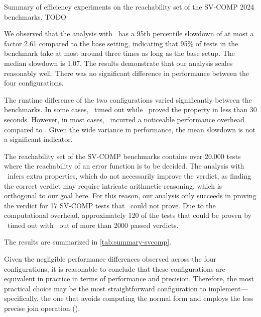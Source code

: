 \begin{table}[t]
    \centering
    \caption{Summary of efficiency experiments on the reachability set
        of the SV-COMP 2024 benchmarks. TODO}
    \label{tab:summary-svcomp}
    
\end{table}

We observed that the analysis with \cpo\ has a 95th percentile slowdown of at most a factor 2.61 compared to the base setting,
indicating that 95\% of tests in the benchmark take at most around three times as long as the base setup.
The median slowdown is 1.07.
The results demonstrate that our analysis scales reasonably well.
There was no significant difference in performance between the four configurations.

The runtime difference of the two configurations varied significantly between the benchmarks.
In some cases, \base\ timed out while \cpo\ proved the property in less than 30 seconds.
However, in most cases, \cpo\ incurred a noticeable performance overhead compared to \base.
Given the wide variance in performance, the mean slowdown is not a significant indicator.

The reachability set of the SV-COMP benchmarks contains over 20,000 tests where the reachability of an error function is to be decided.
The analysis with \cpo\ infers extra properties, which do not necessarily improve the verdict,
as finding the correct verdict may require intricate arithmetic reasoning, which is orthogonal to our goal here.
For this reason, our analysis only succeeds in proving the verdict for 17 SV-COMP tests that \base\ could not prove.
Due to the computational overhead, approximately 120 of the tests that could be proven by \base\ timed out with \cpo\
out of more than 2000 passed verdicts.

The results are summarized in \cref{tab:summary-svcomp}.


Given the negligible performance differences observed across the four configurations, it is reasonable to conclude that these configurations are equivalent in practice in terms of performance and precision.
Therefore, the most practical choice may be the most straightforward configuration to implement---specifically, the one that avoids computing the normal form and employs the less precise join operation (\cpoq).

